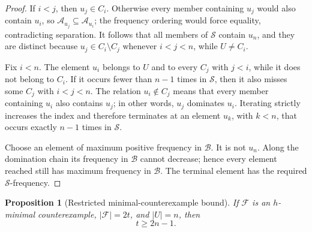 \documentclass[11pt,reqno]{amsart}
\numberwithin{equation}{section}
\newtheorem{proposition}[proposition]{Proposition}
\theoremstyle{definition}
\theoremstyle{remark}
\newcommand{\F}{\mathcal{F}}
\newcommand{\A}{\mathcal{A}}
\newcommand{\1}{\mathbf{1}}
\newcommand{\abs}[1]{\left|#1\right|}
\begin{document}
\begin{proof}
If \(i<j\), then \(u_j\in C_i\).  Otherwise every member containing \(u_j\) would also contain \(u_i\), so
\(
\A_{u_j}\subseteq\A_{u_i}
\); the frequency ordering would force equality, contradicting separation.  It follows that all members of \(\mathcal S\) contain \(u_n\), and they are distinct because \(u_j\in C_i\setminus C_j\) whenever \(i<j<n\), while \(U\ne C_i\).

Fix \(i<n\).  The element \(u_i\) belongs to \(U\) and to every \(C_j\) with \(j<i\), while it does not belong to \(C_i\).  If it occurs fewer than \(n-1\) times in \(\mathcal S\), then it also misses some \(C_j\) with \(i<j<n\).  The relation \(u_i\notin C_j\) means that every member containing \(u_i\) also contains \(u_j\); in other words, \(u_j\) dominates \(u_i\).  Iterating strictly increases the index and therefore terminates at an element \(u_k\), with \(k<n\), that occurs exactly \(n-1\) times in \(\mathcal S\).

Choose an element of maximum positive frequency in \(\mathcal B\).  It is not \(u_n\).  Along the domination chain its frequency in \(\mathcal B\) cannot decrease; hence every element reached still has maximum frequency in \(\mathcal B\).  The terminal element has the required \(\mathcal S\)-frequency.
\end{proof}

\begin{proposition}[Restricted minimal-counterexample bound]\label{prop:lower-bound}
If \(\F\) is an \(h\)-minimal counterexample, \(\abs{\F}=2t\), and \(\abs{U}=n\), then
\begin{equation}\label{eq:t-lower}
\boxed{t\ge 2n-1.}
\end{equation}
\end{proposition}
\end{document}
